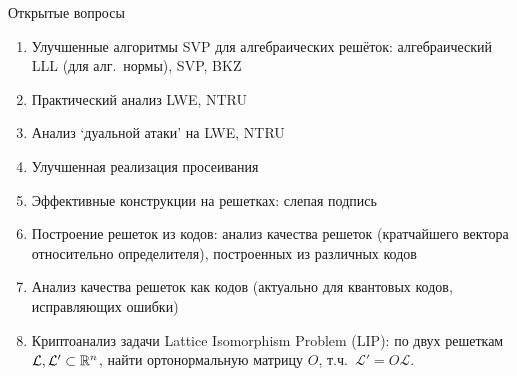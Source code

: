\documentclass[usenames,dvipsnames, 9pt]{beamer}
\begin{document}
\begin{frame}{Открытые вопросы}
\large
\begin{enumerate}
	\setlength\itemsep{5pt}
	 
	\item Улучшенные алгоритмы SVP  для алгебраических решёток: алгебраический LLL (для алг.\ нормы), SVP, BKZ
	\item Практический анализ LWE, NTRU
	\item Анализ `дуальной атаки' на LWE, NTRU
	\item Улучшенная реализация просеивания
	\item Эффективные конструкции на решетках: слепая подпись
	\item Построение решеток из кодов: анализ качества решеток (кратчайшего вектора относительно определителя), построенных из различных кодов
	\item Анализ качества решеток как кодов (актуально для квантовых кодов, исправляющих ошибки)
	\item Криптоанализ задачи Lattice Isomorphism Problem (LIP): по двух решеткам $\mathcal{L}, \mathcal{L'} \subset {{\mathbb R}}^n$, найти ортонормальную матрицу $O$, т.ч.\ $\mathcal{L'} = O \mathcal{L}$. 

\end{enumerate}


\end{frame}
\end{document}
